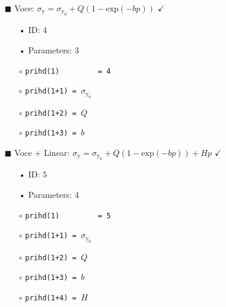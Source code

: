 \documentclass[11pt,a4paper,twoside,final,onecolumn,titlepage]{article}
\newcommand{\verified}{\hspace{0.5pt} {\LARGE $\checkmark$}}
\begin{document}
\begin{itemize}
	\item[\tiny$\blacksquare$] Voce: $\displaystyle \sigma_{\textrm{y}} = \sigma_{\textrm{y}_0} +Q\left(1-\textrm{exp}(-bp)\right)$ \verified{}
	\begin{itemize}
		\item[•] ID: $4$
		\item[•] Parameters: $3$\\
		\item[$\circ$] \texttt{prihd(1)\,\,\,\,\,\,\,\,\,= 4}
		\item[$\circ$] \texttt{prihd(1+1) = $\sigma_{\textrm{y}_0} $}
		\item[$\circ$] \texttt{prihd(1+2) = $Q$}
		\item[$\circ$] \texttt{prihd(1+3) = $b$}\\
	\end{itemize}
\end{itemize}

\begin{itemize}
	\item[\tiny$\blacksquare$] Voce + Linear: $\displaystyle \sigma_{\textrm{y}} = \sigma_{\textrm{y}_0} +Q\left(1-\textrm{exp}(-bp)\right)+Hp$ \verified{}
	\begin{itemize}
		\item[•] ID: $5$
		\item[•] Parameters: $4$\\
		\item[$\circ$] \texttt{prihd(1)\,\,\,\,\,\,\,\,\,= 5}
		\item[$\circ$] \texttt{prihd(1+1) = $\sigma_{\textrm{y}_0} $}
		\item[$\circ$] \texttt{prihd(1+2) = $Q$}
		\item[$\circ$] \texttt{prihd(1+3) = $b$}
		\item[$\circ$] \texttt{prihd(1+4) = $H$}\\
	\end{itemize}
\end{itemize}
\end{document}
